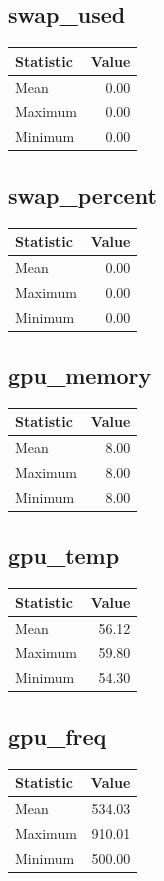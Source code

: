 \documentclass[11pt]{article}
\begin{document}
\subsection{swap_used}
\begin{tabular}{lr}
\toprule
Statistic & Value \\
\midrule
Mean & 0.00 \\
Maximum & 0.00 \\
Minimum & 0.00 \\
\bottomrule
\end{tabular}


\subsection{swap_percent}
\begin{tabular}{lr}
\toprule
Statistic & Value \\
\midrule
Mean & 0.00 \\
Maximum & 0.00 \\
Minimum & 0.00 \\
\bottomrule
\end{tabular}


\subsection{gpu_memory}
\begin{tabular}{lr}
\toprule
Statistic & Value \\
\midrule
Mean & 8.00 \\
Maximum & 8.00 \\
Minimum & 8.00 \\
\bottomrule
\end{tabular}


\subsection{gpu_temp}
\begin{tabular}{lr}
\toprule
Statistic & Value \\
\midrule
Mean & 56.12 \\
Maximum & 59.80 \\
Minimum & 54.30 \\
\bottomrule
\end{tabular}


\subsection{gpu_freq}
\begin{tabular}{lr}
\toprule
Statistic & Value \\
\midrule
Mean & 534.03 \\
Maximum & 910.01 \\
Minimum & 500.00 \\
\bottomrule
\end{tabular}
\end{document}
